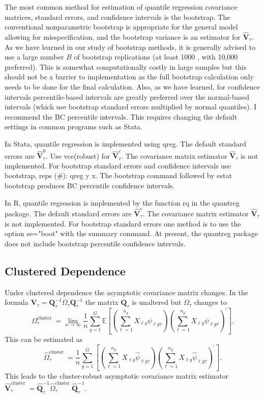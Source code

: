 \documentclass[10pt]{article}
\begin{document}
The most common method for estimation of quantile regression covariance matrices, standard errors, and confidence intervals is the bootstrap. The conventional nonparametric bootstrap is appropriate for the general model allowing for misspecification, and the bootstrap variance is an estimator for $\widehat{\boldsymbol{V}}_{\tau}$. As we have learned in our study of bootstrap methods, it is generally advised to use a large number $B$ of bootstrap replications (at least 1000 , with 10,000 preferred). This is somewhat computationally costly in large samples but this should not be a barrier to implementation as the full bootstrap calculation only needs to be done for the final calculation. Also, as we have learned, for confidence intervals percentile-based intervals are greatly preferred over the normal-based intervals (which use bootstrap standard errors multiplied by normal quantiles). I recommend the BC percentile intervals. This requires changing the default settings in common programs such as Stata.

In Stata, quantile regression is implemented using qreg. The default standard errors are $\widehat{\boldsymbol{V}}_{\tau}^{0}$. Use vce(robust) for $\widehat{\boldsymbol{V}}_{\tau}^{c}$. The covariance matrix estimator $\widehat{\boldsymbol{V}}_{\tau}$ is not implemented. For bootstrap standard errors and confidence intervals use bootstrap, reps (\#): qreg y x. The bootstrap command followed by estat bootstrap produces BC percentile confidence intervals.

In R, quantile regression is implemented by the function rq in the quantreg package. The default standard errors are $\widehat{\boldsymbol{V}}_{\tau}^{c}$. The covariance matrix estimator $\widehat{\boldsymbol{V}}_{\tau}$ is not implemented. For bootstrap standard errors one method is to use the option se="boot" with the summary command. At present, the quantreg package does not include bootstrap percentile confidence intervals.

\subsection{Clustered Dependence}
Under clustered dependence the asymptotic covariance matrix changes. In the formula $\boldsymbol{V}_{\tau}=\boldsymbol{Q}_{\tau}^{-1} \Omega_{\tau} \boldsymbol{Q}_{\tau}^{-1}$ the matrix $\boldsymbol{Q}_{\tau}$ is unaltered but $\Omega_{\tau}$ changes to
$$
\Omega_{\tau}^{\text {cluster }}=\lim _{n \rightarrow \infty} \frac{1}{n} \sum_{g=1}^{G} \mathbb{E}\left[\left(\sum_{\ell=1}^{n_{g}} X_{\ell g} \psi_{\ell g \tau}\right)\left(\sum_{\ell=1}^{n_{g}} X_{\ell g} \psi_{\ell g \tau}\right)^{\prime}\right] .
$$
This can be estimated as
$$
\widehat{\Omega}_{\tau}^{\text {cluster }}=\frac{1}{n} \sum_{g=1}^{G}\left[\left(\sum_{\ell=1}^{n_{g}} X_{\ell g} \widehat{\psi}_{\ell g \tau}\right)\left(\sum_{\ell=1}^{n_{g}} X_{\ell g} \widehat{\psi}_{\ell g \tau}\right)^{\prime}\right] .
$$
This leads to the cluster-robust asymptotic covariance matrix estimator $\widehat{\boldsymbol{V}}_{\tau}^{\text {cluster }}=\widehat{\boldsymbol{Q}}_{\tau}^{-1} \widehat{\Omega}_{\tau}^{\text {cluster }} \widehat{\boldsymbol{Q}}_{\tau}^{-1}$.
\end{document}

